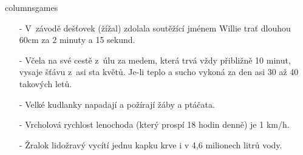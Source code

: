 \begin{multicols}{\value{columnsgames}columnsgames}
\begin{itemize}
\item[-] V~závodě dešťovek (žížal) zdolala soutěžící jménem Willie 
trať dlouhou 60cm za 2 minuty a 15 sekund.

\item[-] Včela na své cestě z~úlu za medem, která trvá vždy přibližně 
10 minut, vysaje šťávu z~asi sta květů. Je-li teplo a sucho 
vykoná za den asi 30 až 40 takových letů.

\item[-] Velké kudlanky napadají a požírají žáby a ptáčata.

\item[-] Vrcholová rychlost lenochoda (který prospí 18 hodin denně) je 
1 km/h.

\item[-] Žralok lidožravý vycítí jednu kapku krve i v 4,6 milionech litrů 
vody.

\end{itemize}

\end{multicols}
\clearpage

